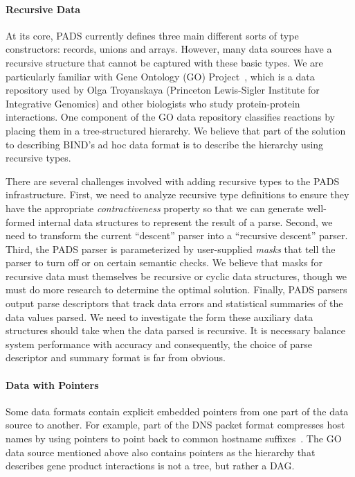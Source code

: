 \documentclass[11pt]{article}
\begin{document}
\paragraph*{Recursive Data}
At its core, PADS currently defines three main different sorts of type 
constructors: 
records, unions and arrays.  However, many data sources have a recursive
structure that cannot be captured with these basic types.  We are
particularly familiar with Gene Ontology (GO) Project~\cite{geneontology},
which is a data repository used by Olga Troyanskaya
(Princeton Lewis-Sigler Institute for Integrative Genomics) 
and other biologists who study protein-protein
interactions.  One component of the GO data repository classifies reactions by placing them
in a tree-structured hierarchy.   We believe that part of the solution
to describing BIND's ad hoc data format is to describe the hierarchy
using recursive types.

There are several challenges involved with adding recursive types to the 
PADS infrastructure.  First, we need to analyze recursive type definitions
to ensure they
have the appropriate {\em contractiveness} property so that we can
generate well-formed internal data structures to represent the result of
a parse.  Second,
we need to transform the current ``descent'' parser into
a ``recursive descent'' parser.  Third, the PADS parser is 
parameterized by user-supplied {\em masks} that tell the parser
to turn off or on certain semantic checks.  We believe that
masks for recursive data must themselves be recursive or cyclic
data structures, though we must do more research to determine the
optimal solution.  Finally, PADS parsers output parse descriptors
that track data errors and statistical summaries of the data values
parsed.  We need to investigate the form these auxiliary
data structures should take when the data parsed is recursive. 
It is necessary balance system performance with accuracy
and consequently, the choice of parse descriptor and summary 
format is far from obvious.

\paragraph*{Data with Pointers}
Some data formats contain explicit embedded pointers 
from one part of the data source to another.
For example, part of the DNS packet format compresses
host names by using pointers to point back to common
hostname suffixes~\cite{dns}.  The GO data source
mentioned above also contains pointers as the
hierarchy that describes gene product interactions
is not a tree, but rather a DAG.  
\end{document}
